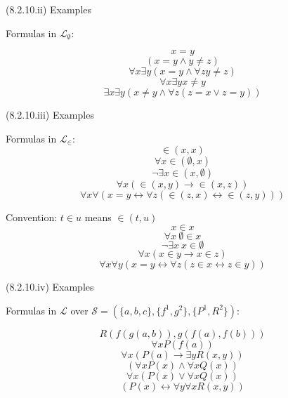 \begin{frame}{(8.2.10.ii) Examples}

Formulas in $\mathcal{L}_\emptyset$:
				
				\[x=y\]
				\[(x=y\land y\neq z)\]
				\[\forall x\exists y(x=y\land \forall z y\neq z)\]
				\[\forall x\exists y x\neq y\]
				\[\exists x\exists y(x\neq y\land \forall z(z=x\lor z=y))\]

\end{frame}

\begin{frame}{(8.2.10.iii) Examples}

Formulas in $\mathcal{L}_\in$:
				\[{\in}(x,x)\]
				\[\forall x{\in}(\emptyset,x)\]
				\[\neg\exists x{\in}(x,\emptyset)\]
				\[\forall x({\in}(x,y)\to {\in}(x,z))\]
				\[\forall x\forall(x=y\leftrightarrow\forall z({\in}(z,x)\leftrightarrow {\in}(z,y))) \]			
				
Convention: $t\in u$ means ${\in}(t,u)$
\[x\in x\]
				\[\forall x~\emptyset\in x\]
				\[\neg\exists x~x\in \emptyset\]
				\[\forall x(x\in y\to x\in z)\]
				\[\forall x\forall y(x=y\leftrightarrow \forall z(z\in x\leftrightarrow z\in y))\]

\end{frame}

\begin{frame}{(8.2.10.iv) Examples}

Formulas in $\mathcal{L}$ over $\mathcal{S}=(\{a,b,c\}, \{f^1, g^2\}, \{P^1, R^2\})$:
				
				\[R(f(g(a,b)),g(f(a),f(b)))\]
				\[\forall x P(f(a))\]
				\[\forall x(P(a)\to \exists yR(x,y))\]
				\[(\forall xP(x)\land \forall xQ(x))\]
				\[\forall x(P(x)\lor \forall xQ(x))\]
				\[(P(x)\leftrightarrow \forall y\forall xR(x,y))\]

\end{frame}

